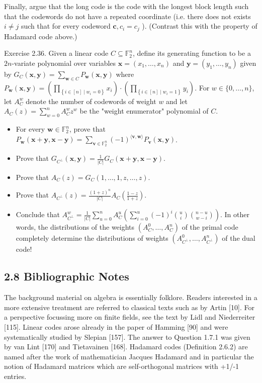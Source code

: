 \documentclass[10pt]{article}
\begin{document}
Finally, argue that the long code is the code with the longest block length such that the codewords do not have a repeated coordinate (i.e. there does not exists $i \neq j$ such that for every codeword $\mathbf{c}, c_{i}=c_{j}$ ). (Contrast this with the property of Hadamard code above.)

Exercise 2.36. Given a linear code $C \subseteq \mathbb{F}_{2}^{n}$, define its generating function to be a $2 n$-variate polynomial over variables $\mathbf{x}=\left(x_{1}, \ldots, x_{n}\right)$ and $\mathbf{y}=\left(y_{1}, \ldots, y_{n}\right)$ given by $G_{C}(\mathbf{x}, \mathbf{y})=\sum_{\mathbf{w} \in C} P_{\mathbf{w}}(\mathbf{x}, \mathbf{y})$ where $P_{\mathbf{w}}(\mathbf{x}, \mathbf{y})=\left(\prod_{\left\{i \in[n] \mid w_{i}=0\right\}} x_{i}\right) \cdot\left(\prod_{\left\{i \in[n] \mid w_{i}=1\right\}} y_{i}\right)$. For $w \in\{0, \ldots, n\}$, let $A_{C}^{w}$ denote the number of codewords of weight $w$ and let $A_{C}(z)=\sum_{w=0}^{n} A_{C}^{w} z^{w}$ be the "weight enumerator" polynomial of $C$.

\begin{itemize}
  \item[1.] For every $\mathbf{w} \in \mathbb{F}_{2}^{n}$, prove that $P_{\mathbf{w}}(\mathbf{x}+\mathbf{y}, \mathbf{x}-\mathbf{y})=\sum_{\mathbf{v} \in \mathbb{F}_{2}^{n}}(-1)^{\langle\mathbf{v}, \mathbf{w}\rangle} P_{\mathbf{v}}(\mathbf{x}, \mathbf{y})$.
  \item[2.] Prove that $G_{C^{\perp}}(\mathbf{x}, \mathbf{y})=\frac{1}{|C|} G_{C}(\mathbf{x}+\mathbf{y}, \mathbf{x}-\mathbf{y})$.
  \item[3.] Prove that $A_{C}(z)=G_{C}(1, \ldots, 1, z, \ldots, z)$.
  \item[4.] Prove that $A_{C^{\perp}}(z)=\frac{(1+z)^{n}}{|C|} A_{C}\left(\frac{1-z}{1+z}\right)$.
  \item[5.] Conclude that $A_{C^{\perp}}^{w}=\frac{1}{|C|} \sum_{u=0}^{n} A_{C}^{u}\left(\sum_{i=0}^{u}(-1)^{i}\binom{u}{i}\binom{n-u}{w-i}\right)$. In other words, the distributions of the weights $\left(A_{C}^{0}, \ldots, A_{C}^{n}\right)$ of the primal code completely determine the distributions of weights $\left(A_{C^{\perp}}^{0}, \ldots, A_{C^{\perp}}^{n}\right)$ of the dual code!
\end{itemize}

\subsection*{2.8 Bibliographic Notes}
The background material on algebra is essentially folklore. Readers interested in a more extensive treatment are referred to classical texts such as by Artin [10]. For a perspective focussing more on finite fields, see the text by Lidl and Niederreiter [115]. Linear codes arose already in the paper of Hamming [90] and were systematically studied by Slepian [157]. The answer to Question 1.7.1 was given by van Lint [170] and Tietavainen [168]. Hadamard codes (Definition 2.6.2) are named after the work of mathematician Jacques Hadamard and in particular the notion of Hadamard matrices which are self-orthogonal matrices with +1/-1 entries.
\end{document}
